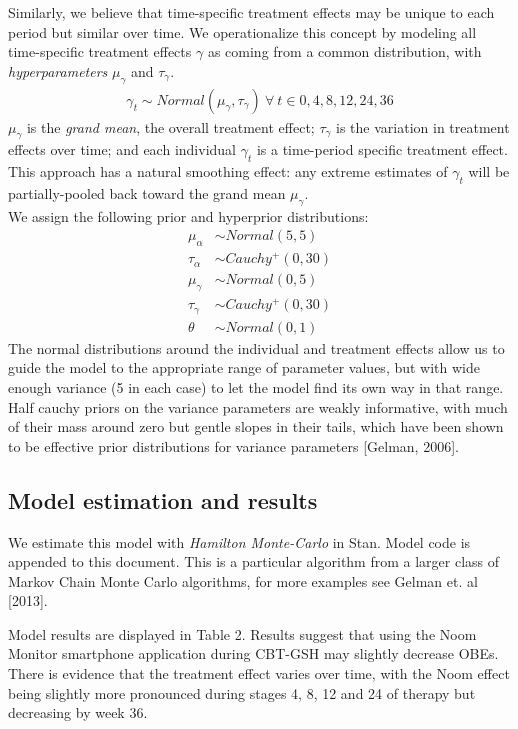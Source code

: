 \documentclass{article}
\begin{document}
%
Similarly, we believe that time-specific treatment effects may be unique to each period but similar over time. We operationalize this concept by modeling all time-specific treatment effects $\gamma$ as coming from a common distribution, with \emph{hyperparameters} $\mu_{\gamma}$ and $\tau_{\gamma}$.
%
\begin{align}
\gamma_t \sim Normal(\mu_{\gamma}, \tau_{\gamma}) \ \forall \ t \in 0, 4, 8, 12, 24, 36
\end{align} 
%
$\mu_{\gamma}$ is the \emph{grand mean}, the overall treatment effect; $\tau_{\gamma}$ is the variation in treatment effects over time; and each individual $\gamma_t$ is a time-period specific treatment effect.  This approach has a natural smoothing effect: any extreme estimates of $\gamma_t$ will be partially-pooled back toward the grand mean $\mu_{\gamma}$.\\
%
We assign the following prior and hyperprior distributions:
\begin{align}
\mu_{\alpha} &\sim Normal(5, 5) \\
\tau_{\alpha} &\sim Cauchy^+(0, 30) \\
\mu_{\gamma} &\sim Normal(0, 5) \\
\tau_{\gamma} &\sim Cauchy^+(0, 30) \\
\theta &\sim Normal(0, 1)
\end{align}
%
The normal distributions around the individual and treatment effects allow us to guide the model to the appropriate range of parameter values, but with wide enough variance (5 in each case) to let the model find its own way in that range.  Half cauchy priors on the variance parameters are weakly informative, with much of their mass around zero but gentle slopes in their tails, which have been shown to be effective prior distributions for variance parameters [Gelman, 2006].

\subsection{Model estimation and results}
We estimate this model with \emph{Hamilton Monte-Carlo} in Stan.  Model code is appended to this document. This is a particular algorithm from a larger class of Markov Chain Monte Carlo algorithms, for more examples see Gelman et. al [2013].

Model results are displayed in Table 2.  Results suggest that using the Noom Monitor smartphone application during CBT-GSH may slightly decrease OBEs.  There is evidence that the treatment effect varies over time, with the Noom effect being slightly more pronounced during stages 4, 8, 12 and 24 of therapy but decreasing by week 36.\\
\end{document}
